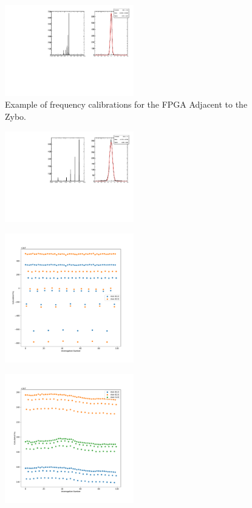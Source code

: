 \begin{figure}[]
\centering
\includegraphics[width=0.5\textwidth]{images/(0,0).pdf}
\caption{Example of frequency calibrations for the FPGA Adjacent to the Zybo.}
\end{figure}

\begin{figure}[]
\centering
\includegraphics[width=0.5\textwidth]{images/(3,3).pdf}
\caption{}
\end{figure}

\begin{figure}[]
\centering
\includegraphics[width=0.5\textwidth]{images/fast_example.pdf}
\caption{}
\end{figure}

\begin{figure}[]
\centering
\includegraphics[width=0.5\textwidth]{images/slow_example.pdf}
\caption{}
\end{figure}







